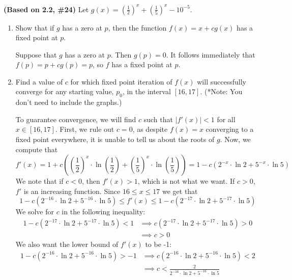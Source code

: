 \documentclass{eh-homework}
\begin{document}
\begin{question}{1}
    \textbf{(Based on 2.2, \#24)} Let \(g(x) = \left(\frac{1}{2}\right)^x + \left(\frac{1}{5}\right)^x - 10^{-5}\).
    
    \begin{enumerate}[label=\alph*.]
        \item Show that if \(g\) has a zero at \(p\), then the function \(f(x) = x + c g(x)\) has a fixed point at \(p\).
        
        Suppose that \(g\) has a zero at \(p\). Then \(g(p) = 0\). It follows immediately that \(f(p) = p + cg(p) = p\), so \(f\) has a fixed point at \(p\).
        
        \item Find a value of \(c\) for which fixed point iteration of \(f(x)\) will successfully converge for any starting value, \(p_0\), in the interval \([16, 17]\). (*Note: You don’t need to include the graphs.)
    
        To guarantee convergence, we will find \(c\) such that \(|f'(x)| < 1\) for all \(x \in [16,17]\). First, we rule out \(c=0\), as despite \(f(x) = x\) converging to a fixed point everywhere, it is unable to tell us about the roots of \(g\). Now, we compute that
        \[
            f'(x) = 1 + c\left( \left(\frac{1}{2}\right)^x \cdot \ln \left( \frac{1}{2} \right) + \left(\frac{1}{5}\right)^x \cdot \ln \left( \frac{1}{5} \right) \right) = 1 - c \left( 2^{-x} \cdot \ln 2 + 5^{-x} \cdot \ln 5 \right)
        \]
        We note that if \(c < 0\), then \(f'(x) > 1\), which is not what we want. If \(c > 0\), \(f'\) is an increasing function. Since \(16 \leq x \leq 17\) we get that
        \[
            1 - c(2^{-16} \cdot \ln 2 + 5^{-16} \cdot \ln 5) \leq f'(x) \leq 1 - c(2^{-17} \cdot \ln 2 + 5^{-17} \cdot \ln 5)
        \]
        We solve for \(c\) in the following inequality:
        \begin{align*}
            1 - c(2^{-17} \cdot \ln 2 + 5^{-17} \cdot \ln 5) < 1 &\implies c(2^{-17} \cdot \ln 2 + 5^{-17} \cdot \ln 5) > 0 \\
            &\implies c > 0
        \end{align*}
        We also want the lower bound of \(f'(x)\) to be -1:
        \begin{align*}
            1 - c(2^{-16} \cdot \ln 2 + 5^{-16} \cdot \ln 5) > -1 &\implies c(2^{-16} \cdot \ln 2 + 5^{-16} \cdot \ln 5) < 2 \\
            &\implies c < \frac{2}{2^{-16} \cdot \ln 2 + 5^{-16} \cdot \ln 5}
        \end{align*}


\end{enumerate}
\end{question}
\end{document}
